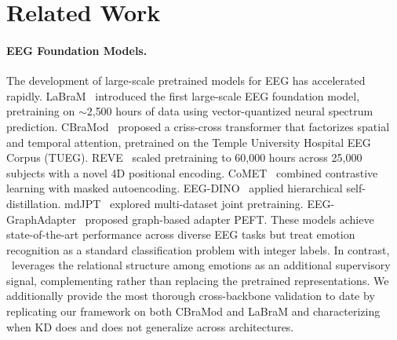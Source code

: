 \section{Related Work}
\label{sec:related}
\vspace{-1mm}

\paragraph{EEG Foundation Models.}
The development of large-scale pretrained models for EEG has accelerated rapidly. LaBraM~\cite{jiang2024labram} introduced the first large-scale EEG foundation model, pretraining on $\sim$2{,}500 hours of data using vector-quantized neural spectrum prediction. CBraMod~\cite{wang2025cbramod} proposed a criss-cross transformer that factorizes spatial and temporal attention, pretrained on the Temple University Hospital EEG Corpus (TUEG). REVE~\cite{elouahidi2025reve} scaled pretraining to 60{,}000 hours across 25{,}000 subjects with a novel 4D positional encoding. CoMET~\cite{li2025comet} combined contrastive learning with masked autoencoding. EEG-DINO~\cite{wang2025eegdino} applied hierarchical self-distillation. mdJPT~\cite{mdjpt2025} explored multi-dataset joint pretraining. EEG-GraphAdapter~\cite{eeg_graphadapter2024} proposed graph-based adapter PEFT. These models achieve state-of-the-art performance across diverse EEG tasks but treat emotion recognition as a standard classification problem with integer labels. In contrast, \ours\ leverages the relational structure among emotions as an additional supervisory signal, complementing rather than replacing the pretrained representations. We additionally provide the most thorough cross-backbone validation to date by replicating our framework on both CBraMod and LaBraM and characterizing when KD does and does not generalize across architectures.

